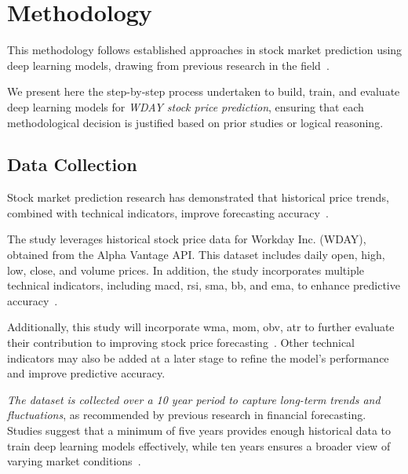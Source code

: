 \clearpage
\section{Methodology}

This methodology follows established approaches in stock market prediction using deep
learning models, drawing from previous research in the 
field~\parencite{parmar2018stock, nabipour2020DeepLearning,
chang2024StockPrediction,agrawal2022StockPrediction, shaban2024SMPDL}. 

We present here the step-by-step process undertaken to build, train, and evaluate deep
learning models for \emph{WDAY stock price prediction}, ensuring that each methodological
decision is justified based on prior studies or logical reasoning.

\subsection{Data Collection}

Stock market prediction research has demonstrated that historical price trends, combined 
with technical indicators, improve forecasting accuracy~\parencite{guo2024LSTMStock,
agrawal2022StockPrediction,balasubramanian2023SystematicSurvey,phuoc2024StockPrediction}. 

The study leverages historical stock price data for Workday Inc. (WDAY), obtained from the
Alpha Vantage API. This dataset includes daily open, high, low, close, and volume prices. In
addition, the study incorporates multiple technical indicators, including 
\acrshort{macd}, \acrshort{rsi}, \acrshort{sma}, \acrshort{bb}, and \acrshort{ema}, to
enhance predictive accuracy~\parencite{parmar2018stock, nabipour2020DeepLearning,
guo2024LSTMStock}. 

Additionally, this study will incorporate \acrshort{wma}, \acrshort{mom}, 
\acrshort{obv}, \acrshort{atr} to further evaluate their contribution to improving stock
price forecasting~\parencite{shaban2024SMPDL, phuoc2024StockPrediction}. Other technical 
indicators may also be added at a later stage to refine the model’s performance and improve
predictive accuracy.

\emph{The dataset is collected over a 10 year period to capture long-term trends and 
fluctuations}, as recommended by previous research in financial forecasting. 
Studies suggest that a minimum of five years provides enough historical data to train deep
learning models effectively, while ten years ensures a broader view of varying 
market conditions~\parencite{shaban2024SMPDL,chang2024StockPrediction}.

